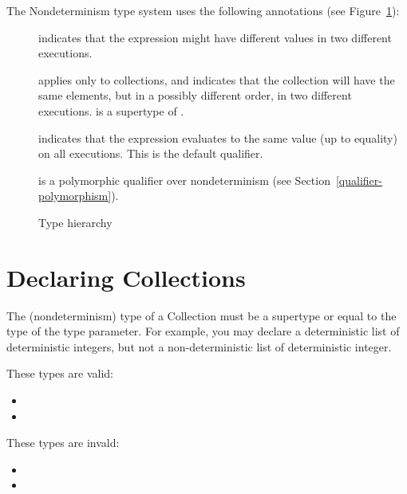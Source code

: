 The Nondeterminism type system uses the following annotations (see Figure~\ref{fig-hierarchy}):
\begin{description}
\item[] indicates
  that the expression might have different values in two different executions.
\item[] applies only
  to collections, and indicates that the collection will have the same
  elements, but in a possibly different order, in two different executions.
   is a supertype of .
\item[] indicates that
  the expression evaluates to the same value (up to equality) on all executions.
  This is the default qualifier.
\item[] is a
  polymorphic qualifier over nondeterminism (see Section~\ref{qualifier-polymorphism}).
\end{description}

\begin{figure}
  \begin{center}
  \end{center}
\caption{Type hierarchy}
\label{fig-hierarchy}
\end{figure}


\section{Declaring Collections\label{nondeterminism-type-validity}}

The (nondeterminism) type of a Collection must be a supertype or equal to
the type of the type parameter.  For example, you may declare a
deterministic list of deterministic integers, but not a non-deterministic
list of deterministic integer.

These types are valid:
\begin{itemize}
    \item {}
    \item {}
\end{itemize}

These types are invald:
  \begin{itemize}
    \item {}
    \item {}
  \end{itemize}

